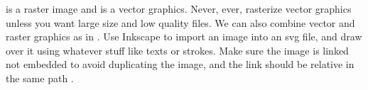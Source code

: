 \begin{teaserfigure}
  \centering
 {%
 is a raster image and  is a vector graphics.
Never, ever, rasterize vector graphics unless you want large size and low quality files.
We can also combine vector and raster graphics as in .
Use Inkscape to import  an image into an svg file, and draw over it using whatever stuff like texts or strokes.
Make sure the image is linked not embedded to avoid duplicating the image, and the link should be relative in the same path \cite{StackExchange:2011:HLI}.
 }
 \label{fig:example}
\end{teaserfigure}
